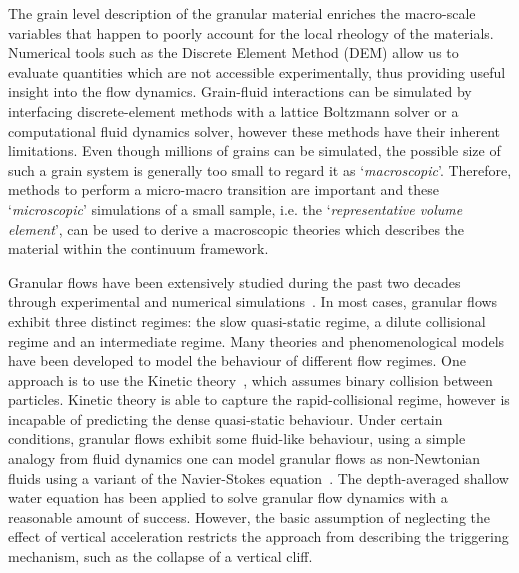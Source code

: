 The grain level description of the granular material enriches the 
macro-scale variables that happen to poorly account for the local rheology of 
the materials. Numerical tools such as the Discrete Element Method (DEM) 
allow us to evaluate quantities which are not accessible experimentally, thus 
providing useful insight into the flow dynamics. Grain-fluid interactions can 
be simulated by interfacing discrete-element methods with a lattice 
Boltzmann solver or a computational fluid dynamics solver, however these 
methods have their inherent limitations. Even though millions of grains can be 
simulated, the possible size of such a grain system is generally too small 
to regard it as `\textit{macroscopic}'. Therefore, methods to perform a 
micro-macro transition are important and these `\textit{microscopic}' 
simulations of a small sample, i.e. the `\textit{representative volume 
element}', can be used to derive a macroscopic theories which describes the 
material within the continuum framework. 

Granular flows have been extensively studied during the past two decades 
through experimental and numerical 
simulations~\citep{Jaeger1996,Iverson1997a,Denlinger2001,Tang2013,Andersen2010}.
In most cases, granular flows exhibit three distinct regimes: the slow 
quasi-static regime, a dilute collisional regime and an intermediate regime. 
Many theories and phenomenological models have been developed to model the 
behaviour of different flow regimes. One approach is to use the Kinetic 
theory~\citep{Jenkins1983, Savage1981}, which assumes binary collision between 
particles. Kinetic theory is able to capture the rapid-collisional regime, 
however is incapable of predicting the dense quasi-static behaviour. Under 
certain conditions, granular 
flows exhibit some fluid-like behaviour, using a simple analogy from fluid 
dynamics one can model granular flows as non-Newtonian fluids using a variant 
of the Navier-Stokes equation~\citep{Savage1991}. The depth-averaged shallow 
water equation has been applied to solve 
granular flow dynamics with a reasonable amount of success. However, the basic 
assumption of neglecting the effect of vertical acceleration restricts the 
approach from describing the triggering mechanism, such as the collapse of a 
vertical cliff.

